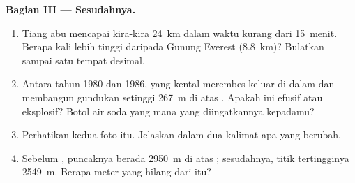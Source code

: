 \begin{problem}
\medskip
\noindent\textbf{Bagian III --- Sesudahnya.}\par\nopagebreak
\begin{enumerate}[resume, beginpenalty=10000]
  \item Tiang abu mencapai  kira-kira \qty{24}{km} dalam waktu
        kurang dari 15~menit. Berapa kali lebih tinggi daripada Gunung
        Everest (\qty{8.8}{km})? Bulatkan sampai satu tempat desimal.
  \item Antara tahun 1980 dan 1986,  yang kental merembes keluar di
        dalam  dan membangun gundukan setinggi \qty{267}{m} di atas
        . Apakah  ini efusif atau eksplosif?
        Botol air soda yang mana yang diingatkannya kepadamu?
  \item Perhatikan kedua foto  itu. Jelaskan dalam dua kalimat apa
        yang berubah.
  \item Sebelum , puncaknya berada \qty{2950}{m} di atas ; sesudahnya, titik tertingginya \qty{2549}{m}. Berapa meter
         yang hilang dari  itu?
\end{enumerate}
\end{problem}
